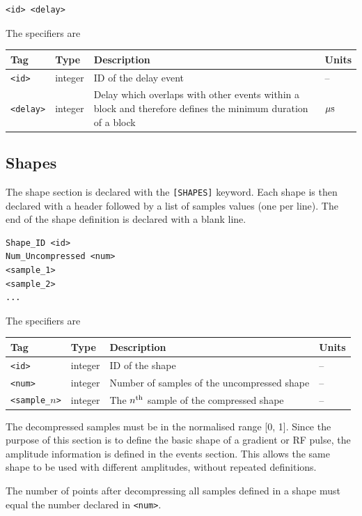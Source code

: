 \documentclass{article}
\begin{document}
\begin{lstlisting}
<id> <delay>
\end{lstlisting}

The specifiers are

\begin{tabularx}{\textwidth}{llXl}
\toprule
Tag & Type & Description & Units\\
\midrule
\verb.<id>. & integer & ID of the delay event & -- \\
\verb.<delay>. & integer & Delay which overlaps with other events within a block and therefore defines the minimum duration of a block & $\rm \mu s$ \\
\bottomrule
\end{tabularx}

\subsection{Shapes}

The shape section is declared with the \verb.[SHAPES]. keyword. Each shape is then declared with a header followed by a list of samples values (one per line). The end of the shape definition is declared with a blank line.

\begin{lstlisting}
Shape_ID <id>
Num_Uncompressed <num>
<sample_1>
<sample_2>
...
\end{lstlisting}

The specifiers are

\begin{tabularx}{\textwidth}{llXl}
\toprule
Tag & Type & Description & Units\\
\midrule
\verb.<id>. & integer & ID of the shape & -- \\
\verb.<num>. & integer & Number of samples of the uncompressed shape & -- \\
\verb.<sample_.$n$\verb.>. & integer & The $n^{\rm th}$ sample of the compressed shape  & -- \\
\bottomrule
\end{tabularx}

The decompressed samples must be in the normalised range [0, 1]. Since the purpose of this section is to define the basic shape of a gradient or RF pulse, the amplitude information is defined in the events section. This allows the same shape to be used with different amplitudes, without repeated definitions.

The number of points after decompressing all samples defined in a shape must equal the number declared in \verb.<num>..
\end{document}
